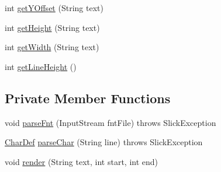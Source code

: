 \begin{DoxyCompactItemize}
\item 
int \mbox{\hyperlink{classorg_1_1newdawn_1_1slick_1_1_angel_code_font_af88eab0e69e2ff42c027bbcbeb6ccd1f}{get\+Y\+Offset}} (String text)
\item 
int \mbox{\hyperlink{classorg_1_1newdawn_1_1slick_1_1_angel_code_font_ad962179705beb6355e270ebc65b04b2a}{get\+Height}} (String text)
\item 
int \mbox{\hyperlink{classorg_1_1newdawn_1_1slick_1_1_angel_code_font_a0202edaba33e21e6bfb3c7dbaebbbb92}{get\+Width}} (String text)
\item 
int \mbox{\hyperlink{classorg_1_1newdawn_1_1slick_1_1_angel_code_font_aa462c138af142eb6086c66205b0456af}{get\+Line\+Height}} ()
\end{DoxyCompactItemize}
\subsection*{Private Member Functions}
\begin{DoxyCompactItemize}
\item 
void \mbox{\hyperlink{classorg_1_1newdawn_1_1slick_1_1_angel_code_font_a8950d304cfa460c9d2755900abda6c02}{parse\+Fnt}} (Input\+Stream fnt\+File)  throws Slick\+Exception 
\item 
\mbox{\hyperlink{classorg_1_1newdawn_1_1slick_1_1_angel_code_font_1_1_char_def}{Char\+Def}} \mbox{\hyperlink{classorg_1_1newdawn_1_1slick_1_1_angel_code_font_a8e57dd6e277285b9fdce64880a05a474}{parse\+Char}} (String line)  throws Slick\+Exception 
\item 
void \mbox{\hyperlink{classorg_1_1newdawn_1_1slick_1_1_angel_code_font_a9e742aa7b9ef84525a6e33bedcefd421}{render}} (String text, int start, int end)
\end{DoxyCompactItemize}
